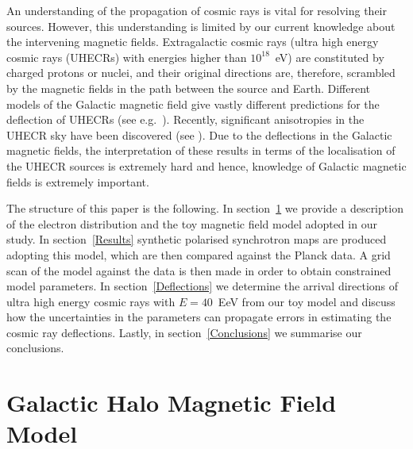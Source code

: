 \documentclass[usenatbib]{mnras}
\begin{document}
An understanding of the propagation of cosmic rays is vital for resolving their sources. However, this understanding is limited by our current knowledge about the intervening magnetic fields. Extragalactic cosmic rays (ultra high energy cosmic rays (UHECRs) with energies higher than $10^{18}$~eV) are constituted by charged protons or nuclei, and their original directions are, therefore, scrambled by the magnetic fields in the path between the source and Earth. Different models of the Galactic magnetic field give vastly different predictions for the deflection of UHECRs (see e.g.~\cite{Sun_2008, Sun_2010, PT11_2011, JF12, FARRAR_2014}). Recently, significant anisotropies in the UHECR sky have been discovered (see \cite{TA_2014, Auger_Starburst2018, ICRC_2019, ICRC_2021}). Due to the deflections in the Galactic magnetic fields, the interpretation of these results in terms of the localisation of the UHECR sources is extremely hard and hence, knowledge of Galactic magnetic fields is extremely important. 

The structure of this paper is the following. In section~\ref{Methods} we provide a description of the electron distribution and the toy magnetic field model adopted in our study. In section~\ref{Results} synthetic polarised synchrotron maps are produced adopting this model, which are then compared against the Planck data. A grid scan of the model against the data is then made in order to obtain constrained model parameters. In section~\ref{Deflections} we determine the arrival directions of ultra high energy cosmic rays with $E = 40$~EeV from our toy model and discuss how the uncertainties in the parameters can propagate errors in estimating the cosmic ray deflections. 
Lastly, in section~\ref{Conclusions} we summarise our conclusions.

\section{Galactic Halo Magnetic Field Model}
\label{Methods}

\end{document}
